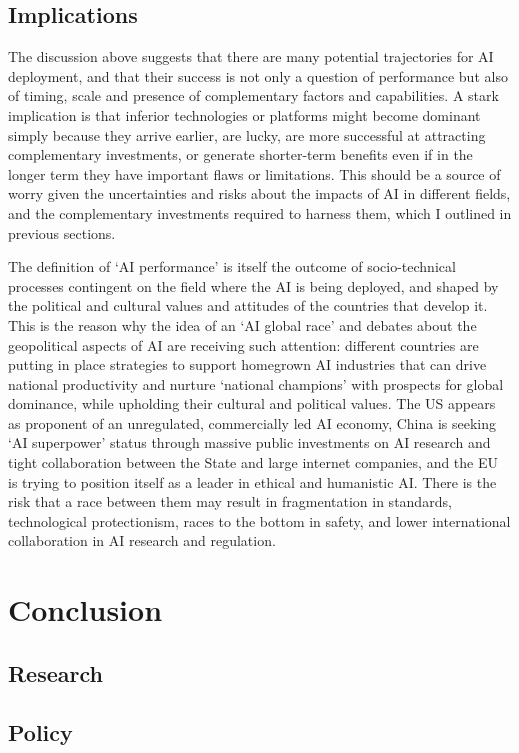 \documentclass[11pt]{article}
\begin{document}
\subsection{Implications}
\label{subsec:races}
The discussion above suggests that there are many potential trajectories for AI deployment, and that their success is not only a question of performance but also of timing, scale and presence of complementary factors and capabilities. A stark implication is that inferior technologies or platforms might become dominant simply because they arrive earlier, are lucky, are more successful at attracting complementary investments, or generate shorter-term benefits even if in the longer term they have important flaws or limitations. This should be a source of worry given the uncertainties and risks about the impacts of AI in different fields, and the complementary investments required to harness them, which I outlined in previous sections.

The definition of `AI performance' is itself the outcome of socio-technical processes contingent on the field where the AI is being deployed, and shaped by the political and cultural values and attitudes of the countries that develop it. This is the reason why the idea of an `AI global race' and debates about the geopolitical aspects of AI are receiving such attention: different countries are putting in place strategies to support homegrown AI industries that can drive national productivity and nurture `national champions' with prospects for global dominance, while upholding their cultural and political values. The US appears as proponent of an unregulated, commercially led AI economy, China is seeking `AI superpower' status through massive public investments on AI research and tight collaboration between the State and large internet companies, and the EU is trying to position itself as a leader in ethical and humanistic AI. There is the risk that a race between them may result in fragmentation in standards, technological protectionism, races to the bottom in safety, and lower international collaboration in AI research and regulation. 

\section{Conclusion}
\label{subsec:conclusion}

\subsection{Research}
\label{subsec:research}

\subsection{Policy}
\label{subsec:policy}
\subsection{}







\singlespacing
\setlength\bibsep{0pt}


\end{document}
